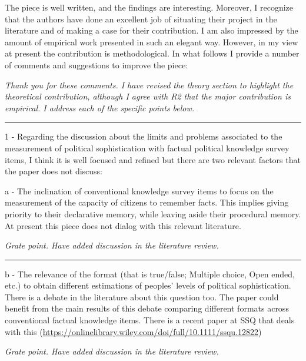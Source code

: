The piece is well written, and the findings are interesting. Moreover, I recognize that the authors have done an excellent job of situating their project in the literature and of making a case for their contribution. I am also impressed by the amount of empirical work presented in such an elegant way. However, in my view at present the contribution is methodological. In what follows I provide a number of comments and suggestions to improve the piece:

\textit{Thank you for these comments. I have revised the theory section to highlight the theoretical contribution, although I agree with R2 that the major contribution is empirical. I address each of the specific points below.}


\rule{\linewidth}{.01cm}

1 - Regarding the discussion about the limits and problems associated to the measurement of political sophistication with factual political knowledge survey items, I think it is well focused and refined but there are two relevant factors that the paper does not discuss: 

a - The inclination of conventional knowledge survey items to focus on the measurement of the capacity of citizens to remember facts. This implies giving priority to their declarative memory, while leaving aside their procedural memory. At present this piece does not dialog with this relevant literature.

\textit{Grate point. Have added discussion in the literature review.}


\rule{\linewidth}{.01cm}

b - The relevance of the format (that is true/false; Multiple choice, Open ended, etc.) to obtain different estimations of peoples' levels of political sophistication. There is a debate in the literature about this question too. The paper could benefit from the main results of this debate comparing different formats across conventional factual knowledge items. There is a recent paper at SSQ that deals with this (\url{https://onlinelibrary.wiley.com/doi/full/10.1111/ssqu.12822})

\textit{Grate point. Have added discussion in the literature review.}


